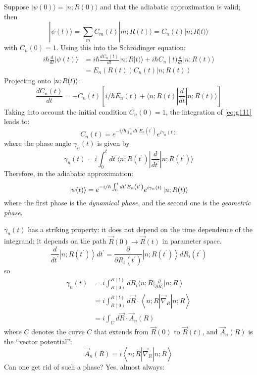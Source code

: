 \documentclass[12pt]{article}
\newcommand{\be}{\begin{equation}}
\newcommand{\ee}{\end{equation}}
\begin{document}
Suppose $|\psi(0)\rangle=|n ; R(0)\rangle$ and that the adiabatic
approximation is valid; then
\be
|\psi(t)\rangle=\sum_m C_{m}(t)|m ; R(t)\rangle=C_{n}(t)|n ; R| t)\rangle
\ee
with $C_n(0) = 1$.
Using this into the Schrödinger equation:
\be
\begin{aligned}
i \hbar \frac{d}{d t}|\psi(t)\rangle
&=i \hbar \frac{d C_{n}(t)}{d t}|n ; R| t)\rangle+i \hbar C_{n} \mid t) \frac{d}{d t}|n ; R(t)\rangle\\
&=E_{n}(R(t)) C_{n}(t)\left|n ; R(t)\right\rangle
\end{aligned}
\ee
Projecting onto $\ket{n;R(t)}$:
\be
\frac{d C_{n}(t)}{d t}=-C_{n}(t)
\left[i / \hbar E_{n}(t)+\langle n ; R(t)|\frac{d}{d t}|n ; R(t)\rangle\right]
\label{eq:g111} 
\ee
Taking into account the initial condition $C_{n}(0)=1$, the
integration of \eqref{eq:g111} leads to:
\be
C_{n}(t)=e^{-i / \hbar \int_{0}^{t} d t^{\prime} E_{n}\left(t^{\prime}\right)} e^{i \gamma_{n}(t)}
\ee
where the phase angle $\gamma_n(t)$ is given by
\be
\gamma_{n}(t)=i \int_{0}^{t} d t^{\prime}\langle n ; R(t^{\prime})|\frac{d}{d t^{\prime}}|n ; R(t^{\prime})\rangle
\ee
Therefore, in the adiabatic approximation:
\be
\ket{\psi(t)} = e^{-i / \hbar \int_{0}^{t} d t^{\prime} E_{n}\left(t^{\prime}\right)} e^{i \gamma_{n}(t)} \ket{n;R(t)}
\ee
where the first phase is the \emph{dynamical phase}, 
and the second one is the \emph{geometric phase}.

$\gamma_{n}(t)$ has a striking property: it does not depend
on the time dependence of the integrand; it depends 
on the path $\vec{R}(0) \to \vec{R}(t)$  in parameter space.
\be
\frac{d}{d t^{\prime}}\left|n ; R\left(t^{\prime}\right)\right\rangle d t^{\prime}=\frac{\partial}{\partial R_{i}\left(t^{\prime}\right)}\left|n ; R\left(t^{\prime}\right)\right\rangle d R_{i}\left(t^{\prime}\right)
\ee
so
\begin{align}
\gamma_{n}(t)
&=i \int_{R(0)}^{R(t)} d R_{i}\langle n ; R| \frac{\partial}{\partial R_{i}}\left|n ; R\right\rangle\nonumber\\
&=i \int_{R(0)}^{R(t)} d \vec{R} \cdot\left\langle n ; R\left|\vec{\nabla}_{\!R}\right| n ; R\right\rangle\\
&=i \int_{C} d \vec{R} \cdot \vec{A}_{n}(R)
\end{align}
where $C$ denotes the curve $C$ that extends from
$\vec{R}(0)$ to $\vec{R}(t)$, and $\vec{A}_{n}(R)$ is the ``vector
potential'':
\be
\vec{A}_{n}(R)=i\left\langle n ; R\left|\vec{\nabla}_{\!R}\right| n ; R\right\rangle
\ee
Can one get rid of such a phase? Yes, almost always:
\end{document}
